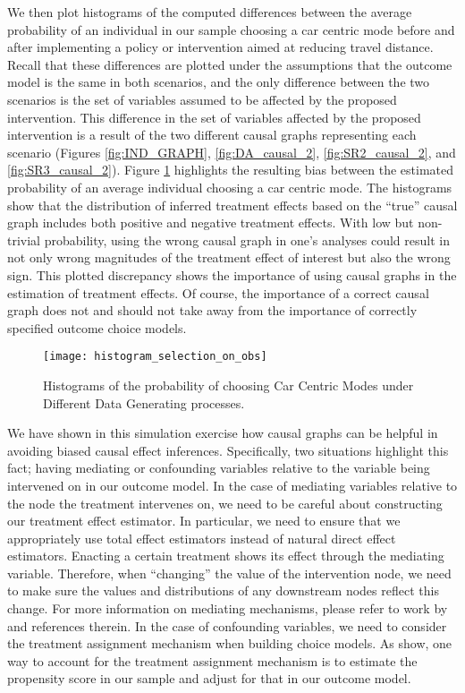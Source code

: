 We then plot histograms of the computed differences between the average probability of an individual
in our sample choosing a car centric mode before and after implementing a policy or intervention
aimed at reducing travel distance.
Recall that these differences are plotted under the assumptions that the outcome model is the same in both scenarios, and the only difference between the two scenarios is the set of variables assumed to be affected by the proposed intervention.
This difference in the set of variables affected by the proposed intervention is a result of the two different causal graphs representing each scenario (Figures \ref{fig:IND_GRAPH}, \ref{fig:DA_causal_2}, \ref{fig:SR2_causal_2}, and \ref{fig:SR3_causal_2}).
Figure \ref{fig:histogram_probability} highlights the resulting bias between the estimated probability of an average individual choosing a car centric mode.
The histograms show that the distribution of inferred treatment effects based on the ``true'' causal graph includes both positive and negative treatment effects.
With low but non-trivial probability, using the wrong causal graph in one's analyses could result in not only wrong magnitudes of the treatment effect of interest but also the wrong sign.
This plotted discrepancy shows the importance of using causal graphs in the estimation of treatment effects.
Of course, the importance of a correct causal graph does not and should not take away from the importance of correctly specified outcome choice models.

\begin{figure}[h!]
   \centering
   \texttt{[image: histogram\_selection\_on\_obs]}
   \caption{Histograms of the probability of choosing Car Centric Modes under Different Data Generating processes.}
   \label{fig:histogram_probability}
\end{figure}

We have shown in this simulation exercise how causal graphs can be helpful in avoiding biased causal effect inferences.
Specifically, two situations highlight this fact; having mediating or confounding variables relative to the variable being intervened on in our outcome model.
In the case of mediating variables relative to the node the treatment intervenes on, we need to be careful about constructing our treatment effect estimator.
In particular, we need to ensure that we appropriately use total effect estimators instead of natural direct effect estimators.
Enacting a certain treatment shows its effect through the mediating variable.
Therefore, when ``changing'' the value of the intervention node, we need to make sure the values and distributions of any downstream nodes reflect this change.
For more information on mediating mechanisms, please refer to work by \citet{pearl_2012_mediation} and references therein.
In the case of confounding variables, we need to consider the treatment assignment mechanism when building choice models.
As \citep{hahn_2020_bayesian} show, one way to account for the treatment assignment mechanism is to estimate the propensity score in our sample and adjust for that in our outcome model.

